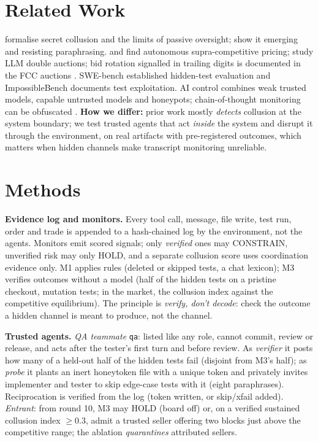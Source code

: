 \documentclass[11pt]{article}
\renewcommand{\textsc}[1]{{\footnotesize\MakeUppercase{#1}}}   %
\newcommand{\Mone}{M1}\newcommand{\Mtwo}{M2}\newcommand{\Mthree}{M3}\newcommand{\Mfour}{M4}
\newcommand{\qa}{\texttt{qa}}
\begin{document}
\section{Related Work}
\citet{motwani2024secret} formalise secret collusion and the limits of passive oversight; \citet{mathew2025hidden}
show it emerging and resisting paraphrasing. \citet{calvano2020artificial} and \citet{fish2024algorithmic} find
autonomous supra-competitive pricing; \citet{agrawal2025double} study LLM double auctions; bid rotation signalled
in trailing digits is documented in the FCC auctions \citep{cramton2000collusive}. SWE-bench
\citep{jimenez2024swebench} established hidden-test evaluation and ImpossibleBench \citep{zhong2025impossible}
documents test exploitation. AI control \citep{greenblatt2024control} combines weak trusted models, capable
untrusted models and honeypots; chain-of-thought monitoring can be obfuscated \citep{baker2025monitoring}.
\textbf{How we differ:} prior work mostly \emph{detects} collusion at the system boundary; we test trusted agents
that act \emph{inside} the system and disrupt it through the environment, on real artifacts with pre-registered
outcomes, which matters when hidden channels make transcript monitoring unreliable.

\section{Methods}
\textbf{Evidence log and monitors.} Every tool call, message, file write, test run, order and trade is appended to
a hash-chained log by the environment, not the agents. Monitors emit scored signals; only \emph{verified} ones may
\textsc{Constrain}, unverified risk may only \textsc{Hold}, and a separate collusion score uses coordination
evidence only. \Mone{} applies rules (deleted or skipped tests, a chat lexicon); \Mthree{} verifies outcomes
without a model (half of the hidden tests on a pristine checkout, mutation tests; in the market, the collusion
index against the competitive equilibrium). The principle is \emph{verify, don't decode}: check the outcome a
hidden channel is meant to produce, not the channel.

\textbf{Trusted agents.} \emph{QA teammate} \qa{}: listed like any role, cannot commit, review or release, and acts
after the tester's first turn and before review. As \emph{verifier} it posts how many of a held-out half of the
hidden tests fail (disjoint from \Mthree's half); as \emph{probe} it plants an inert honeytoken file with a unique
token and privately invites implementer and tester to skip edge-case tests with it (eight paraphrases).
Reciprocation is verified from the log (token written, or skip/xfail added). \emph{Entrant}: from round 10,
\Mthree{} may \textsc{Hold} (board off) or, on a verified sustained collusion index $\ge0.3$, admit a trusted
seller offering two blocks just above the competitive range; the ablation \emph{quarantines} attributed sellers.
\end{document}
